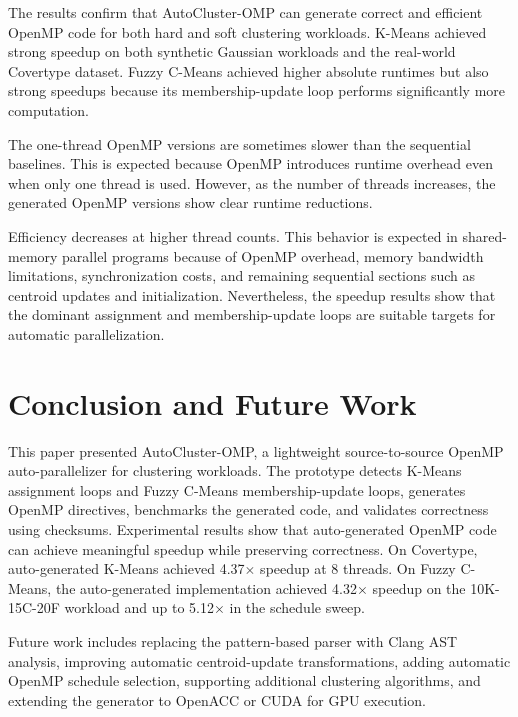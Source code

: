\documentclass[conference,10pt]{IEEEtran}
\begin{document}
The results confirm that AutoCluster-OMP can generate correct and efficient OpenMP code for both hard and soft clustering workloads. K-Means achieved strong speedup on both synthetic Gaussian workloads and the real-world Covertype dataset. Fuzzy C-Means achieved higher absolute runtimes but also strong speedups because its membership-update loop performs significantly more computation.

The one-thread OpenMP versions are sometimes slower than the sequential baselines. This is expected because OpenMP introduces runtime overhead even when only one thread is used. However, as the number of threads increases, the generated OpenMP versions show clear runtime reductions.

Efficiency decreases at higher thread counts. This behavior is expected in shared-memory parallel programs because of OpenMP overhead, memory bandwidth limitations, synchronization costs, and remaining sequential sections such as centroid updates and initialization. Nevertheless, the speedup results show that the dominant assignment and membership-update loops are suitable targets for automatic parallelization.

\section{Conclusion and Future Work}

This paper presented AutoCluster-OMP, a lightweight source-to-source OpenMP auto-parallelizer for clustering workloads. The prototype detects K-Means assignment loops and Fuzzy C-Means membership-update loops, generates OpenMP directives, benchmarks the generated code, and validates correctness using checksums. Experimental results show that auto-generated OpenMP code can achieve meaningful speedup while preserving correctness. On Covertype, auto-generated K-Means achieved 4.37$\times$ speedup at 8 threads. On Fuzzy C-Means, the auto-generated implementation achieved 4.32$\times$ speedup on the 10K-15C-20F workload and up to 5.12$\times$ in the schedule sweep.

Future work includes replacing the pattern-based parser with Clang AST analysis, improving automatic centroid-update transformations, adding automatic OpenMP schedule selection, supporting additional clustering algorithms, and extending the generator to OpenACC or CUDA for GPU execution.



\end{document}
